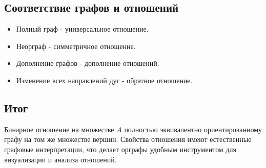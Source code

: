 {\subsection*{Соответствие графов и отношений}

\begin{itemize}
    \item Полный граф - универсальное отношение.
    \item Неорграф - симметричное отношение.
    \item Дополнение графов - дополнение отношений.
    \item Изменение всех направлений дуг - обратное отношение.
\end{itemize}

\subsection*{Итог}
Бинарное отношение на множестве $A$ полностью эквивалентно ориентированному графу на том же множестве вершин. Свойства отношения имеют естественные графовые интерпретации, что делает орграфы удобным инструментом для визуализации и анализа отношений.


    \newpage
}
